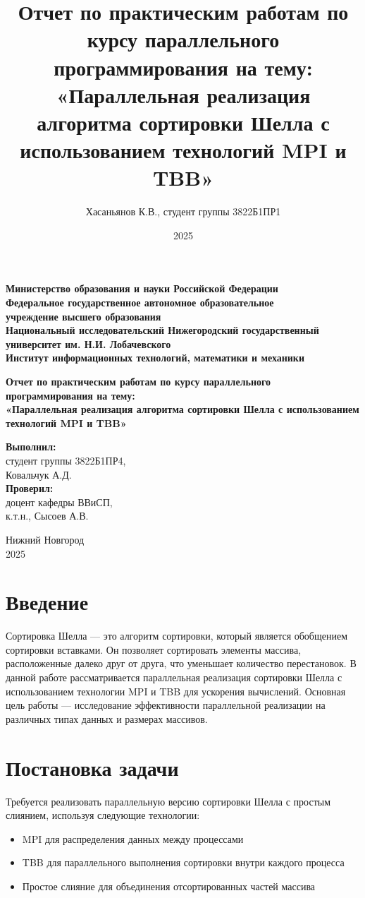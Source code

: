 \documentclass[12pt]{article}
\title{Отчет по практическим работам по курсу параллельного программирования на тему:\\[20pt]
«Параллельная реализация алгоритма сортировки Шелла с использованием технологий MPI и TBB»}
\author{Хасаньянов К.В., студент группы 3822Б1ПР1}
\date{2025}
\begin{document}
\sloppy

\begin{titlepage}
    \centering
    \textbf{Министерство образования и науки Российской Федерации\\[5pt]
    Федеральное государственное автономное образовательное\\
    учреждение высшего образования\\
    Национальный исследовательский Нижегородский государственный университет им. Н.И. Лобачевского\\[10pt]
    Институт информационных технологий, математики и механики}\\[30pt]

    \vfill

    \textbf{\Large Отчет по практическим работам по курсу параллельного программирования на тему:\\[20pt]
    «Параллельная реализация алгоритма сортировки Шелла с использованием технологий MPI и TBB»}\\[70pt]

    \hfill\parbox{0.35\textwidth}{
        \textbf{Выполнил:}\\
        студент группы 3822Б1ПР4,\\
        Ковальчук А.Д.\\[10pt]
        \textbf{Проверил:}\\
        доцент кафедры ВВиСП,\\
        к.т.н., Сысоев А.В.\\
    }

    \vfill

    Нижний Новгород\\
    2025
\end{titlepage}

\tableofcontents
\newpage

\section{Введение}
Сортировка Шелла — это алгоритм сортировки, который является обобщением сортировки вставками. Он позволяет сортировать элементы массива, расположенные далеко друг от друга, что уменьшает количество перестановок. В данной работе рассматривается параллельная реализация сортировки Шелла с использованием технологии MPI и TBB для ускорения вычислений. Основная цель работы — исследование эффективности параллельной реализации на различных типах данных и размерах массивов.

\section{Постановка задачи}
Требуется реализовать параллельную версию сортировки Шелла с простым слиянием, используя следующие технологии:
\begin{itemize}
\item MPI для распределения данных между процессами
\item TBB для параллельного выполнения сортировки внутри каждого процесса
\item Простое слияние для объединения отсортированных частей массива
\end{itemize}
\end{document}
